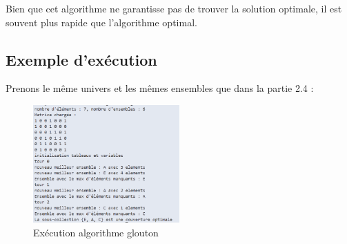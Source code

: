 \documentclass[a4paper, 12pt, twoside]{article}
\begin{document}
Bien que cet algorithme ne garantisse pas de trouver la solution optimale, il est souvent plus rapide que l'algorithme optimal.

\subsection{Exemple d'exécution}

Prenons le même univers et les mêmes ensembles que dans la partie 2.4 :

\begin{figure}[h]  %
    \centering  %
    \includegraphics[width=0.5\textwidth]{./glouton.png}  %
    \caption{Exécution algorithme glouton}
    \label{fig:exemple_image}  %
\end{figure}
\end{document}
